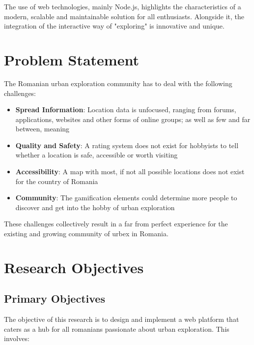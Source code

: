 \documentclass[12pt,a4paper]{report}
\begin{document}
The use of web technologies, mainly Node.js, highlights the characteristics of a modern, scalable and maintainable solution for all enthusiasts. Alongside it, the integration of the interactive way of "exploring" is innovative and unique.



\section*{Problem Statement}

The Romanian urban exploration community has to deal with the following challenges:

\begin{itemize}
    \item \textbf{Spread Information}: Location data is unfocused, ranging from forums, applications, websites and other forms of online groups; as well as few and far between, meaning  
    
    \item \textbf{Quality and Safety}: A rating system does not exist for hobbyists to tell whether a location is safe, accessible or worth visiting
    
    \item \textbf{Accessibility}: A map with most, if not all possible locations does not exist for the country of Romania
    
    \item \textbf{Community}: The gamification elements could determine more people to discover and get into the hobby of urban exploration 
\end{itemize}

These challenges collectively result in a far from perfect experience for the existing and growing community of urbex in Romania.

\section*{Research Objectives}

\subsection*{Primary Objectives}

The objective of this research is to design and implement a web platform that caters as a hub for all romanians passionate about urban exploration. This involves:
\end{document}
